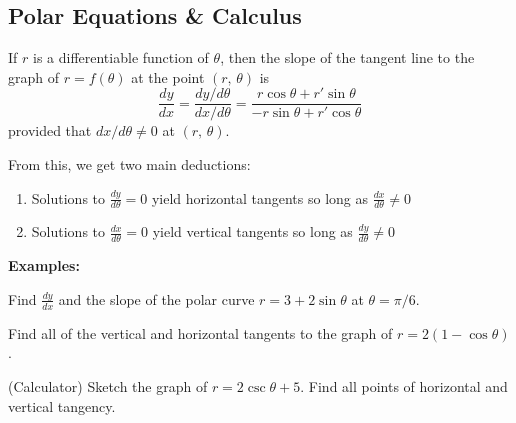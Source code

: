 \subsection*{Polar Equations \& Calculus}

\begin{tcolorbox}[title= SLOPE IN POLAR FORM ,colframe=black,sharp corners,colback=white,colbacktitle=white,coltitle=black]

    
    If $r$ is a differentiable function of $\theta$, then the slope of the tangent line to the graph of $r=f(\theta)$ at the point $(r,\,\theta)$ is
    \[\frac{dy}{dx}=\frac{dy/d\theta}{dx/d\theta}=\frac{r\cos\theta+r'\sin\theta}{-r\sin\theta+r'\cos\theta}\]
    provided that $dx/d\theta\ne0$ at $(r,\,\theta)$.
    
\end{tcolorbox}
\vspace{.1cm}

From this, we get two main deductions:
\begin{enumerate}
    \item Solutions to $\displaystyle\frac{dy}{d\theta}=0$ yield horizontal tangents so long as $\displaystyle\frac{dx}{d\theta}\ne0$
    \item Solutions to $\displaystyle\frac{dx}{d\theta}=0$ yield vertical tangents so long as $\displaystyle\frac{dy}{d\theta}\ne0$
\end{enumerate}
\noindent\textbf{Examples:}
\begin{questions}
    \question Find $\frac{dy}{dx}$ and the slope of the polar curve $r=3+2\sin\theta$ at $\theta=\pi/6$.
    
    \question Find all of the vertical and horizontal tangents to the graph of $r=2(1-\cos\theta)$.
    
    \question (Calculator) Sketch the graph of $r=2\csc\theta+5$. Find all points of horizontal and vertical tangency.
\end{questions}


\newpage
